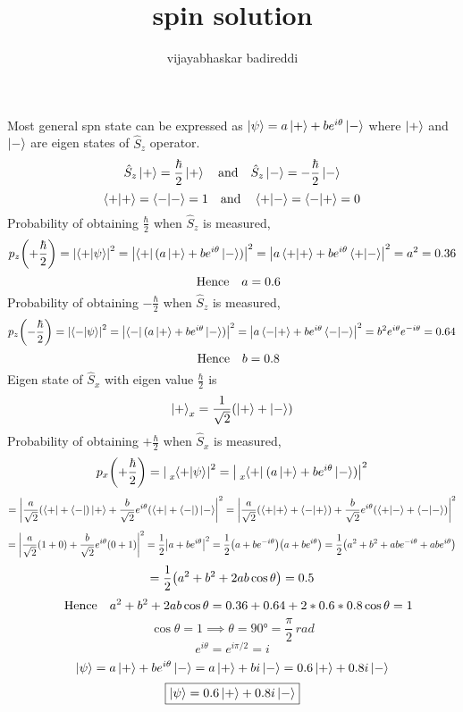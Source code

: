 \documentclass[12pt]{article}
\title{spin solution}
\author{vijayabhaskar badireddi}
\begin{document}
Most general spn state can be expressed as $\ket{\psi}=a\ket{+}+be^{i\theta}\ket{-}$ where $\ket{+}$ and $\ket{-}$ are eigen states of $\hat{S}_z$ operator.
\[\hat{S}_z\ket{+}=\frac{\hbar}{2}\ket{+}\qq{and}\hat{S}_z\ket{-}=-\frac{\hbar}{2}\ket{-}\]
\[\braket{+}{+}=\braket{-}{-}=1\qq{and}\braket{+}{-}=\braket{-}{+}=0\]
Probability of obtaining $\frac{\hbar}{2}$ when $\hat{S}_z$ is measured, \[p_z\qty(+\frac{\hbar}{2})=\abs{\braket{+}{\psi}}^2=\abs{\bra{+}(a\ket{+}+be^{i\theta}\ket{-})}^2=\abs{a\braket{+}{+}+be^{i\theta}\braket{+}{-}}^2=a^2=0.36\]
\[\qq{Hence}a=0.6\]
Probability of obtaining $-\frac{\hbar}{2}$ when $\hat{S}_z$ is measured, \[p_z\qty(-\frac{\hbar}{2})=\abs{\braket{-}{\psi}}^2=\abs{\bra{-}(a\ket{+}+be^{i\theta}\ket{-})}^2=\abs{a\braket{-}{+}+be^{i\theta}\braket{-}{-}}^2=b^2e^{i\theta}e^{-i\theta}=0.64\]
\[\qq{Hence}b=0.8\]
Eigen state of $\hat{S}_x$ with eigen value $\frac{\hbar}{2}$ is \[\ket{+}_x=\frac{1}{\sqrt{2}}\qty(\ket{+}+\ket{-})\]
Probability of obtaining $+\frac{\hbar}{2}$ when $\hat{S}_x$ is measured, \[p_x\qty(+\frac{\hbar}{2})=\abs{\tensor*[_x]{\braket{+}{\psi}}{}}^2=\abs{\tensor[_x]{\bra{+}}{}(a\ket{+}+be^{i\theta}\ket{-})}^2\]
\[=\abs{\frac{a}{\sqrt{2}}\qty(\bra{+}+\bra{-})\ket{+}+\frac{b}{\sqrt{2}}e^{i\theta}\qty(\bra{+}+\bra{-})\ket{-}}^2=\abs{\frac{a}{\sqrt{2}}\qty(\braket{+}{+}+\braket{-}{+})+\frac{b}{\sqrt{2}}e^{i\theta}\qty(\braket{+}{-}+\braket{-}{-})}^2\]
\[=\abs{\frac{a}{\sqrt{2}}\qty(1+0)+\frac{b}{\sqrt{2}}e^{i\theta}\qty(0+1)}^2=\frac{1}{2}\abs{a+be^{i\theta}}^2=\frac{1}{2}\qty(a+be^{-i\theta})\qty(a+be^{i\theta})=\frac{1}{2}\qty(a^2+b^2+abe^{-i\theta}+abe^{i\theta})\]
\[=\frac{1}{2}\qty(a^2+b^2+2ab\cos\theta)=0.5\]
\[\qq{Hence}a^2+b^2+2ab\cos\theta=0.36+0.64+2*0.6*0.8\cos\theta=1\]
\[\cos\theta=1\implies\theta=\ang{90}=\frac{\pi}{2}\,rad\]
\[e^{i\theta}=e^{i\pi/2}=i\]
\[\ket{\psi}=a\ket{+}+be^{i\theta}\ket{-}=a\ket{+}+bi\ket{-}=0.6\ket{+}+0.8i\ket{-}\]
\[\boxed{\ket{\psi}=0.6\ket{+}+0.8i\ket{-}}\]
\end{document}
